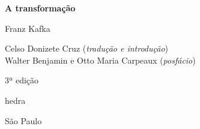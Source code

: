 




\begingroup\thispagestyle{empty}\vspace*{.05\textheight} 

              \formular
              \Huge
              \noindent
              \textbf{A transformação}
              

              
              {\brabo\LARGE
              \noindent Franz Kafka}
              
              \vfill
              
              \newfontfamily{}
              {\fontsize{30}{40}\selectfont\minion\small
              \noindent{}Celso Donizete Cruz (\textit{tradução e introdução})\\
              
              \vspace{-2.5em}
              \noindent{}Walter Benjamin e Otto Maria Carpeaux (\textit{posfácio})
              }

              \noindent
              {\fontsize{30}{40}\selectfont\minion\small\noindent 3ª edição}

              \vfill

              \newfontfamily{}
              {\noindent\fontsize{30}{40}\selectfont \timesnewroman hedra}

              \vspace{-0.5cm}
              {\selectfont\minion\small\noindent São Paulo \quad\the\year}

\endgroup
\pagebreak
